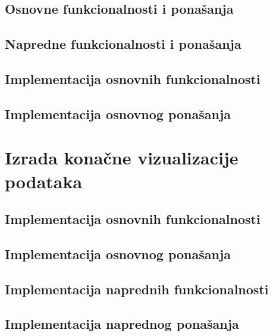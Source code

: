 \documentclass[12pt]{article}
\numberwithin{equation}{section}
\begin{document}
\subsection{Osnovne funkcionalnosti i ponašanja}
\subsection{Napredne funkcionalnosti i ponašanja}
\subsection{Implementacija osnovnih funkcionalnosti}
\subsection{Implementacija osnovnog ponašanja}
\newpage
\section{Izrada konačne vizualizacije podataka}
\subsection{Implementacija osnovnih funkcionalnosti}
\subsection{Implementacija osnovnog ponašanja}
\subsection{Implementacija naprednih funkcionalnosti}
\subsection{Implementacija naprednog ponašanja}
\newpage
\printbibliography
{}
\end{document}
